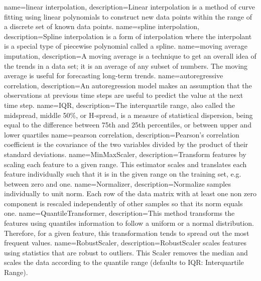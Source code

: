 {
    name={linear interpolation},
    description={Linear interpolation is a method of curve fitting using linear polynomials to construct new data points within the range of a discrete set of known data points.}
}
{
    name={spline interpolation},
    description={Spline interpolation is a form of interpolation where the interpolant is a special type of piecewise polynomial called a spline.}
}
{
    name={moving average imputation},
    description={A moving average is a technique to get an overall idea of the trends in a data set; it is an average of any subset of numbers. The moving average is useful for forecasting long-term trends.}
}
{
    name={autoregressive correlation},
    description={An autoregression model makes an assumption that the observations at previous time steps are useful to predict the value at the next time step.}
}
{
    name={IQR},
    description={The interquartile range, also called the midspread, middle 50\%, or H‑spread, is a measure of statistical dispersion, being equal to the difference between 75th and 25th percentiles, or between upper and lower quartiles}
}
{
    name={pearson correlation},
    description={Pearson's correlation coefficient is the covariance of the two variables divided by the product of their standard deviations.}
}
{
    name={MinMaxScaler},
    description={Transform features by scaling each feature to a given range. This estimator scales and translates each feature individually such that it is in the given range on the training set, e.g. between zero and one.}
}
{
    name={Normalizer},
    description={Normalize samples individually to unit norm. Each row of the data matrix with at least one non zero component is rescaled independently of other samples so that its norm equals one.}
}
{
    name={QuantileTransformer},
    description={This method transforms the features using quantiles information to follow a uniform or a normal distribution. Therefore, for a given feature, this transformation tends to spread out the most frequent values.}
}
{
    name={RobustScaler},
    description={RobustScaler scales features using statistics that are robust to outliers. This Scaler removes the median and scales the data according to the quantile range (defaults to IQR: Interquartile Range).}
}
